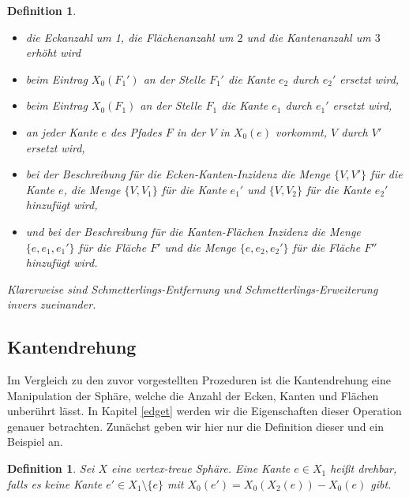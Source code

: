\documentclass[12pt,titlepage,twoside,cleardoublepage]{article}
\theoremstyle{nummermitklammern}
\newtheorem{definition}[temp]{Definition}
\newtheorem{definition}[zahl]{Definition}
\numberwithin{equation}{section}
\begin{document}
\begin{definition}
 \begin{itemize}
 \item die Eckanzahl um 1, die Flächenanzahl um $2$ und die Kantenanzahl um $3$ erhöht wird 
 \item beim Eintrag $X_0(F_1')$ an der Stelle $F_1'$ die Kante $e_2$ durch $e_2'$ ersetzt wird,
 \item beim Eintrag $X_0(F_1)$ an der Stelle $F_1$ die Kante $e_1$ durch $e_1'$ ersetzt wird,
 \item an jeder Kante $e$ des Pfades $F$ in der $V$ in $X_0(e)$ vorkommt, $V$ durch $V'$ ersetzt wird, 
\item  bei der Beschreibung  für die Ecken-Kanten-Inzidenz die Menge $\{V,V'\}$ für die Kante $e$, die Menge $\{V,V_1\}$ für die Kante $e_1'$ und $\{V,V_2\}$ für die Kante $e_2'$ hinzufügt wird,
\item und bei der Beschreibung für die Kanten-Flächen Inzidenz  die Menge $\{e,e_1,e_1'\}$ für die Fläche $F'$ und die Menge $\{e,e_2,e_2'\}$ für die Fläche $F''$ hinzufügt wird.
 \end{itemize}
  Klarerweise sind Schmetterlings-Entfernung und Schmetterlings-Erweiterung invers zueinander.
 \end{definition}
\subsection{Kantendrehung}
Im Vergleich zu den zuvor vorgestellten Prozeduren ist die Kantendrehung eine Manipulation der Sphäre, welche die Anzahl der Ecken, Kanten und Flächen unberührt lässt. In Kapitel \ref{edget} werden wir die Eigenschaften dieser Operation genauer betrachten. Zunächst geben wir hier nur die Definition dieser und ein Beispiel an.
\begin{definition}
Sei $X$ eine vertex-treue Sphäre. Eine Kante $e\in X_1$ heißt  \emph{drehbar}, falls es keine Kante $e'\in X_1\setminus \{e\}$ mit $X_0(e')=X_0(X_2(e))-X_0(e)$ gibt.
\end{definition}
\end{document}

